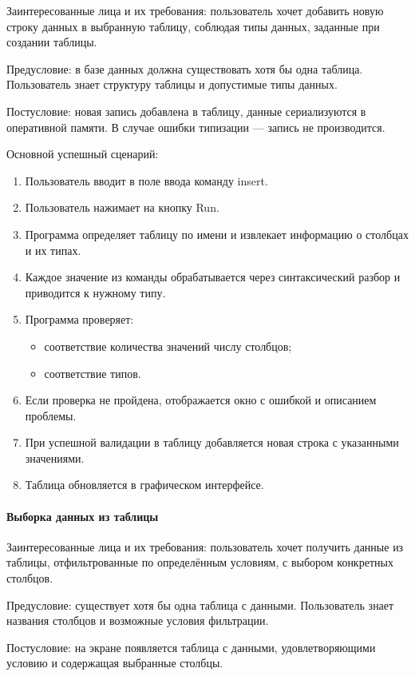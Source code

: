 Заинтересованные лица и их требования: пользователь хочет добавить новую строку данных в выбранную таблицу, соблюдая типы данных, заданные при создании таблицы.

Предусловие: в базе данных должна существовать хотя бы одна таблица. Пользователь знает структуру таблицы и допустимые типы данных.

Постусловие: новая запись добавлена в таблицу, данные сериализуются в оперативной памяти. В случае ошибки типизации — запись не производится.

Основной успешный сценарий:
\begin{enumerate}
	\item Пользователь вводит в поле ввода команду insert.	
	\item Пользователь нажимает на кнопку Run.	
	\item Программа определяет таблицу по имени и извлекает информацию о столбцах и их типах.	
	\item Каждое значение из команды обрабатывается через синтаксический разбор и приводится к нужному типу.	
	\item Программа проверяет:
	\begin{itemize}
		\item соответствие количества значений числу столбцов;	
		\item соответствие типов.
	\end{itemize}
	\item Если проверка не пройдена, отображается окно с ошибкой и описанием проблемы.	
	\item При успешной валидации в таблицу добавляется новая строка с указанными значениями.	
	\item Таблица обновляется в графическом интерфейсе.
\end{enumerate}

\paragraph{Выборка данных из таблицы}

Заинтересованные лица и их требования: пользователь хочет получить данные из таблицы, отфильтрованные по определённым условиям, с выбором конкретных столбцов.

Предусловие: существует хотя бы одна таблица с данными. Пользователь знает названия столбцов и возможные условия фильтрации.

Постусловие: на экране появляется таблица с данными, удовлетворяющими условию и содержащая выбранные столбцы.

